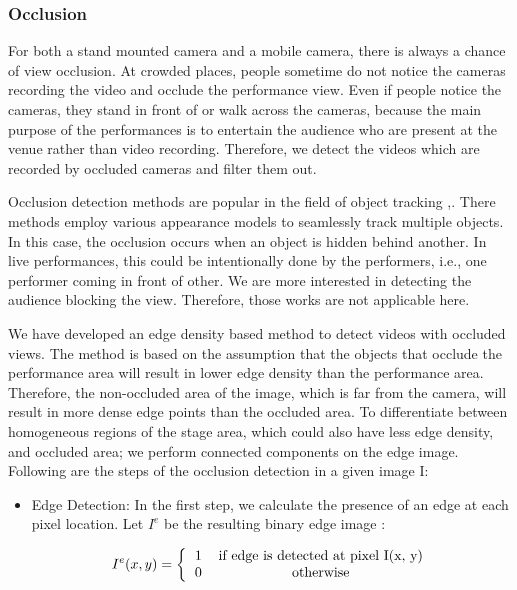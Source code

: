 \documentclass{sig-alternate}
\begin{document}
\subsubsection{Occlusion}
For both a stand mounted camera and a mobile camera, there is always a chance of view occlusion. At crowded places, people sometime do not notice the cameras recording the video and occlude the performance view. Even if people notice the cameras, they stand in front of or walk across the cameras, because the main purpose of the performances is to entertain the audience who are present at the venue rather than video recording. Therefore, we detect the videos which are recorded by occluded cameras and filter them out.

Occlusion detection methods are popular in the field of object tracking \cite{13},\cite{19}. There methods employ various appearance models to seamlessly track multiple objects. In this case, the occlusion occurs when an object is hidden behind another. In live performances, this could be intentionally done by the performers, i.e., one performer coming in front of other. We are more interested in detecting the audience blocking the view. Therefore, those works are not applicable here.

We have developed an edge density based method to detect videos with occluded views. The method is based on the assumption that the objects that occlude the performance area will result in lower edge density than the performance area. Therefore, the non-occluded area of the image, which is far from the camera, will result in more dense edge points than the occluded area. To differentiate between homogeneous regions of the stage area, which could also have less edge density, and occluded area; we perform connected components on the edge image. Following are the steps of the occlusion detection in a given image I:

\begin{itemize}
\item Edge Detection: In the first step, we calculate the presence of
an edge at each pixel location. Let $I^e$ be the resulting binary
edge image :

\begin{equation} I^e(x,y) = \bigg\{ 
\begin{tabular}{cc}
  1  & if edge is detected at pixel I(x, y)\\
  0  & otherwise
\end{tabular}  
\end{equation}
\end{itemize}  
  
\end{document}
